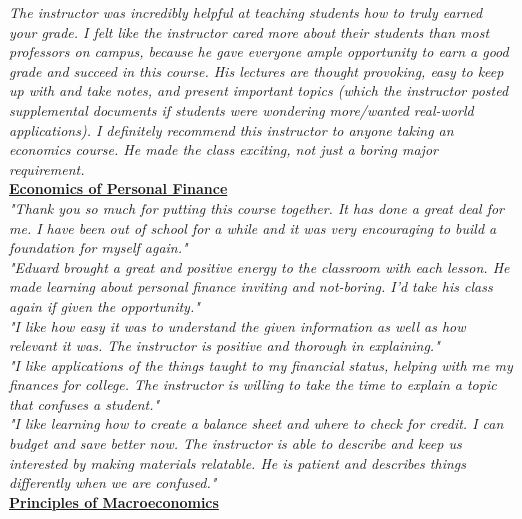 \documentclass[a4paper,11pt]{article}
\begin{document}
\textit{The instructor was incredibly helpful at teaching students how to truly earned your grade. I felt like the instructor cared more about their students than
	most professors on campus, because he gave everyone ample opportunity to earn a good grade and succeed in this course. His lectures are thought
	provoking, easy to keep up with and take notes, and present important topics (which the instructor posted supplemental documents if students were
	wondering more/wanted real-world applications). I definitely recommend this instructor to anyone taking an economics course. He made the class
	exciting, not just a boring major requirement.} \\


\ul{\textbf{Economics of Personal Finance}} \\

\textit{"Thank you so much for putting this course together. It has done a great deal for me. I have been out of school for a while and it was very encouraging to build a foundation for myself again."} \\

\textit{"Eduard brought a great and positive energy to the classroom with each lesson. He made learning about personal finance inviting and not-boring. I'd take his class again if given the opportunity."} \\

\textit{"I like how easy it was to understand the given information as well as how relevant it was. The instructor is positive and thorough in explaining."} \\

\textit{"I like applications of the things taught to my financial status, helping with me my finances for college. The instructor is willing to take the time to explain a topic that confuses a student."} \\


\textit{"I like learning how to create a balance sheet and where to check for credit. I can budget and save better now. The instructor is able to describe and keep us interested by making materials relatable. He is patient and describes things differently when we are confused."} \\




\ul{\textbf{Principles of Macroeconomics}} \\
\end{document}
